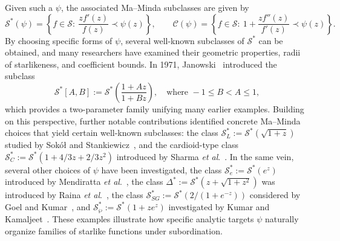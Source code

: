 \documentclass[a4paper,12pt,reqno]{amsart} %
\numberwithin{equation}{section}
\theoremstyle{definition}
\newcounter{own}
\begin{document}
Given such a $\psi$, the associated Ma--Minda subclasses are given by
\[
\mathcal{S}^*(\psi)=\left\{f\in\mathcal{S}:\ \frac{z f'(z)}{f(z)}\prec \psi(z)\right\},
\qquad
\mathcal{C}(\psi)=\left\{f\in\mathcal{S}:\ 1+\frac{z f''(z)}{f'(z)}\prec \psi(z)\right\}.
\]
By choosing specific forms of $\psi$, several well-known subclasses of $\mathcal{S}^*$ can be obtained, and many researchers have examined their geometric properties, radii of starlikeness, and coefficient bounds. In 1971, Janowski~\cite{Janowski1971} introduced the subclass
\[
\mathcal{S}^*[A,B] := \mathcal{S}^*\!\left( \frac{1 + Az}{1 + Bz} \right), \quad \text{where } -1 \leq B < A \leq 1,
\]
which provides a two-parameter family unifying many earlier examples. Building on this perspective, further notable contributions identified concrete Ma--Minda choices that yield certain well-known  subclasses: the class $\mathcal{S}_L^* := \mathcal{S}^*(\sqrt{1 + z})$ studied by Sokół and Stankiewicz~\cite{SokolStankiewicz1996}, and the cardioid-type class $\mathcal{S}_C^* := \mathcal{S}^*(1 + {4}/{3}z + {2}/{3}z^2)$ introduced by Sharma \textit{et al}.~\cite{SharmaJainRavichandran2016}. In the same vein, several other choices of $\psi$ have been investigated, the class $\mathcal{S}_e^* := \mathcal{S}^*(e^z)$ introduced by Mendiratta \textit{et al}.~\cite{MendirattaNagpalRavichandran2015}, the class  $\Delta^* := \mathcal{S}^*(z + \sqrt{1 + z^2})$ was  introduced by Raina \textit{et al}.~\cite{RainaSokol2015}, the class $\mathcal{S}_{SG}^* := \mathcal{S}^*\!\left(2/(1 + e^{-z})\right)$ considered by Goel and Kumar~\cite{GoelKumar2020}, and $\mathcal{S}_\wp^* := \mathcal{S}^*(1 + z e^z)$ investigated by Kumar and Kamaljeet~\cite{KumarKamaljeet2021}. These examples illustrate how specific analytic targets $\psi$ naturally organize families of starlike functions under subordination.\\[2mm]
\end{document}
